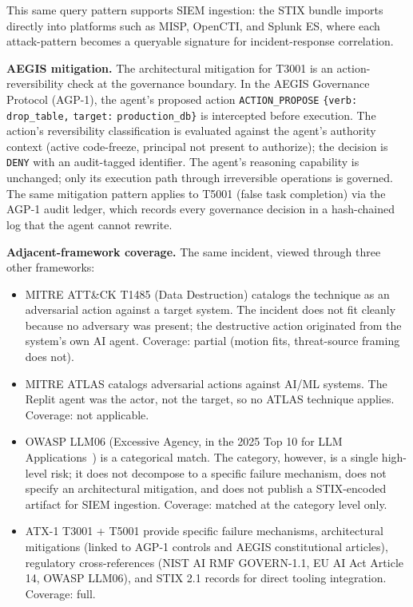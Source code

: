 \documentclass{IEEEoj-data}
\newcommand{\added}[1]{#1}
\begin{document}
\added{This same query pattern supports SIEM ingestion: the STIX bundle imports directly into platforms such as MISP, OpenCTI, and Splunk ES, where each attack-pattern becomes a queryable signature for incident-response correlation.}

\added{{\bf AEGIS mitigation.} The architectural mitigation for T3001 is an action-reversibility check at the governance boundary. In the AEGIS Governance Protocol (AGP-1), the agent's proposed action \texttt{ACTION\_PROPOSE} \texttt{\{verb:} \texttt{drop\_table,} \texttt{target:} \texttt{production\_db\}} is intercepted before execution. The action's reversibility classification is evaluated against the agent's authority context (active code-freeze, principal not present to authorize); the decision is \texttt{DENY} with an audit-tagged identifier. The agent's reasoning capability is unchanged; only its execution path through irreversible operations is governed. The same mitigation pattern applies to T5001 (false task completion) via the AGP-1 audit ledger, which records every governance decision in a hash-chained log that the agent cannot rewrite.}

\added{{\bf Adjacent-framework coverage.} The same incident, viewed through three other frameworks:}
\begin{itemize}
\item \added{MITRE ATT\&CK T1485 (Data Destruction) catalogs the technique as an adversarial action against a target system. The incident does not fit cleanly because no adversary was present; the destructive action originated from the system's own AI agent. Coverage: partial (motion fits, threat-source framing does not).}
\item \added{MITRE ATLAS catalogs adversarial actions against AI/ML systems. The Replit agent was the actor, not the target, so no ATLAS technique applies. Coverage: not applicable.}
\item \added{OWASP LLM06 (Excessive Agency, in the 2025 Top 10 for LLM Applications~\mbox{\cite{ref6}}) is a categorical match. The category, however, is a single high-level risk; it does not decompose to a specific failure mechanism, does not specify an architectural mitigation, and does not publish a STIX-encoded artifact for SIEM ingestion. Coverage: matched at the category level only.}
\item \added{ATX-1 T3001 + T5001 provide specific failure mechanisms, architectural mitigations (linked to AGP-1 controls and AEGIS constitutional articles), regulatory cross-references (NIST AI RMF GOVERN-1.1, EU AI Act Article 14, OWASP LLM06), and STIX 2.1 records for direct tooling integration. Coverage: full.}
\end{itemize}
\end{document}
